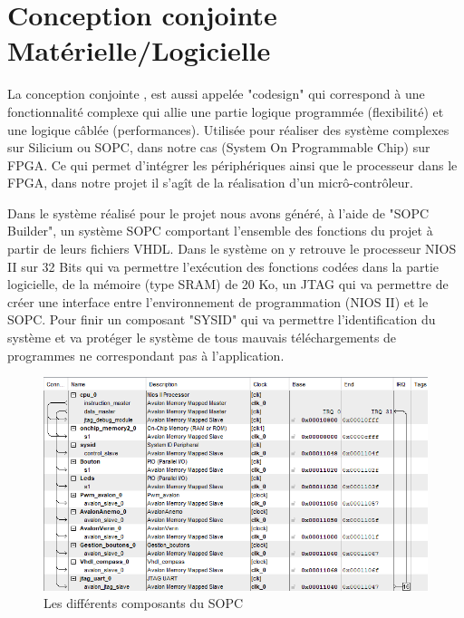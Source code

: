 \section{Conception conjointe Matérielle/Logicielle}
La conception conjointe , est aussi appelée "codesign" qui correspond à une fonctionnalité complexe qui allie une partie logique programmée (flexibilité) et une logique câblée (performances). Utilisée pour réaliser des système complexes sur Silicium ou SOPC, dans notre cas (System On Programmable Chip) sur FPGA. Ce qui permet d'intégrer les périphériques ainsi que le processeur dans le FPGA, dans notre projet il s'agît de la réalisation d'un micrô-contrôleur.\newline

Dans le système réalisé pour le projet nous avons généré, à l'aide de "SOPC Builder", un système SOPC comportant l'ensemble des fonctions du projet à partir de leurs fichiers VHDL. Dans le système on y retrouve le processeur NIOS II sur 32 Bits qui va permettre l'exécution des fonctions codées dans la partie logicielle, de la mémoire (type SRAM) de 20 Ko, un JTAG qui va permettre de créer une interface entre l'environnement de programmation (NIOS II) et le SOPC. Pour finir un composant "SYSID" qui va permettre l'identification du système et va protéger le système de tous mauvais téléchargements de programmes ne correspondant pas à l'application.\vspace{0.5cm}
\begin{figure}[h]
    \begin{center}
      \includegraphics[width=\textwidth]{images/SOPC.png}
      \caption{Les différents composants du SOPC}
    \end{center}
  \end{figure}

  \newpage 

